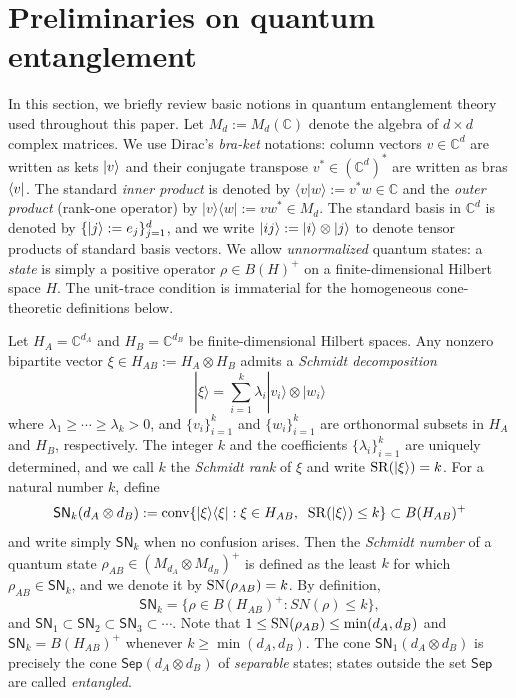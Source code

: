 \documentclass[11pt,reqno]{amsart}
\theoremstyle{definition}
\theoremstyle{definition}
\theoremstyle{definition}
\theoremstyle{definition}
\newcommand{\la}{\langle}
\newcommand{\ra}{\rangle}
\newcommand{\Comp}{\mathbb{C}}
\newcommand{\sch}{\mathsf{SN}}
\newcommand{\SN}{{\rm SN}}
\newcommand{\Sep}{\mathsf{Sep}}
\begin{document}
\section{Preliminaries on quantum entanglement} \label{sec:prelim}

In this section, we briefly review basic notions in quantum entanglement theory used throughout this paper. Let $M_d:=M_d(\Comp)$ denote the algebra of $d\times d$ complex matrices. We use Dirac's \textit{bra-ket} notations: column vectors $v \in \mathbb{C}^d$ are written as kets $\ket{v}$ and their conjugate transpose $v^* \in (\Comp^d)^*$ are written as bras $\bra{v}$.
The standard \emph{inner product} is denoted by $\langle v | w \rangle:=v^*w\in \Comp$ and the \emph{outer product} (rank-one operator) by $|v\ra\la w|:=vw^*\in M_d$. The standard basis in $\Comp^d$ is denoted by $\{\ket{j}:=e_j\}_{j=1}^d$, and we write $\ket{ij} := \ket{i} \otimes \ket{j}$ to denote tensor products of standard basis vectors. We allow \emph{unnormalized} quantum states: a \emph{state} is simply a positive operator $\rho\in B(H)^+$ on a finite-dimensional Hilbert space $H$. The unit-trace condition is immaterial for the homogeneous cone-theoretic definitions below.

Let $H_A=\Comp^{d_A}$ and $H_B=\Comp^{d_B}$ be finite-dimensional Hilbert spaces. Any nonzero bipartite vector $\xi\in H_{AB}:=H_A\otimes H_B$ admits a \textit{Schmidt decomposition} \cite{NiCh} 
    $$|\xi\ra=\sum_{i=1}^k{\lambda_i}|v_i\ra\otimes |w_i\ra$$
where $\lambda_1\geq \cdots \geq \lambda_k>0$, and $\{v_i\}_{i=1}^k$ and $\{w_i\}_{i=1}^k$ are orthonormal subsets in $H_A$ and $H_B$, respectively. The integer $k$ and the coefficients $\{\lambda_i\}_{i=1}^k$ are uniquely determined, and we call $k$ the \textit{Schmidt rank} of $\xi$ and write ${\rm SR}(|\xi\ra)=k$. For a natural number $k$, define
    $$\sch_k(d_A\otimes d_B):={\rm conv}\{|\xi\ra\la \xi|: \xi\in H_{AB},\;\; {\rm SR}(|\xi\ra)\leq k\}\subset B(H_{AB})^+$$
and write simply $\sch_k$ when no confusion arises. Then the \textit{Schmidt number} of a quantum state $\rho_{AB}\in (M_{d_A}\otimes M_{d_B})^+$ is defined as the least $k$ for which $\rho_{AB}\in \sch_k$, and we denote it by ${\rm SN}(\rho_{AB})=k$. By definition,
    $$\sch_k=\{\rho\in B(H_{AB})^+:SN(\rho)\leq k\},$$
and $\sch_1\subset \sch_2\subset \sch_3\subset\cdots$. Note that $1\leq \SN(\rho_{AB})\leq \min(d_A,d_B)$ and $\sch_k=B(H_{AB})^+$ whenever $k\geq \min(d_A,d_B)$. The cone $\sch_1(d_A\otimes d_B)$ is precisely the cone $\Sep(d_A\otimes d_B)$ of \textit{separable} states; states outside the set $\Sep$ are called \textit{entangled}.
\end{document}
